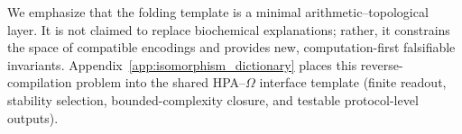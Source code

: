 We emphasize that the folding template is a minimal arithmetic--topological layer.
It is not claimed to replace biochemical explanations; rather, it constrains the space of compatible encodings and provides new, computation-first falsifiable invariants.
Appendix~\ref{app:isomorphism_dictionary} places this reverse-compilation problem into the shared HPA--$\Omega$ interface template (finite readout, stability selection, bounded-complexity closure, and testable protocol-level outputs).


